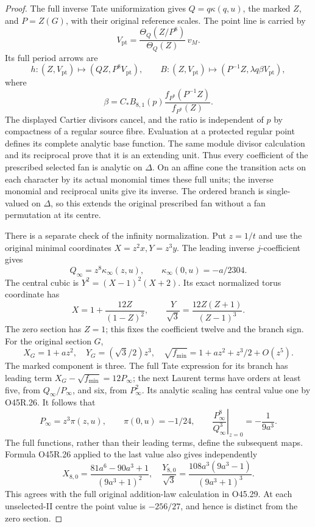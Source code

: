 \begin{proof}
The full inverse Tate uniformization gives
\(Q=q\kappa(q,u)\), the marked \(Z\), and
\(P=Z(G)\), with their original reference
scales. The point line is carried by
\[
 V_{\mathrm{pt}}=
 \frac{\Theta_Q(Z/P^8)}{\Theta_Q(Z)}\,v_M.
 \tag{O45R.22}
\]
Its full period arrows are
\[
 h:(Z,V_{\mathrm{pt}})\mapsto(QZ,P^8V_{\mathrm{pt}}),
 \qquad
 B:(Z,V_{\mathrm{pt}})\mapsto
        (P^{-1}Z,\lambda q\beta V_{\mathrm{pt}}),
 \tag{O45R.23}
\]
where
\[
 \beta=C_* B_{8,1}(p)
       \frac{f_{P^8}(P^{-1}Z)}{f_{P^8}(Z)} .
 \tag{O45R.24}
\]
The displayed Cartier divisors cancel, and
the ratio is independent of \(p\) by
compactness of a regular source fibre.
Evaluation at a protected regular point
defines its complete analytic base function.
The same module divisor calculation and
its reciprocal prove that it is an
extending unit. Thus every coefficient of
the prescribed selected fan is analytic on
\(\Delta\). On an affine cone the transition
acts on each character by its actual
monomial times these full units; the
inverse monomial and reciprocal units
give its inverse. The ordered branch is
single-valued on \(\Delta\), so this
extends the original prescribed fan
without a fan permutation at its centre.

There is a separate check of the infinity
normalization. Put \(z=1/t\) and use the
original minimal coordinates
\(X=z^2x,Y=z^3y\). The leading inverse
\(j\)-coefficient gives
\[
 Q_\infty=z^8\kappa_\infty(z,u),\qquad
 \kappa_\infty(0,u)=-a/2304 .
 \tag{O45R.25}
\]
The central cubic is
\(Y^2=(X-1)^2(X+2)\). Its exact normalized
torus coordinate has
\[
 X=1+\frac{12Z}{(1-Z)^2},\qquad
 \frac{Y}{\sqrt3}
      =\frac{12Z(Z+1)}{(Z-1)^3}.
 \tag{O45R.26}
\]
The zero section has \(Z=1\); this fixes
the coefficient twelve and the branch
sign. For the original section \(G\),
\[
 X_G=1+az^2,\quad
 Y_G=(\sqrt3/2)z^3,\quad
 \sqrt{f_{\min}}=1+az^2+z^3/2+O(z^5).
 \tag{O45R.27}
\]
The marked component is three. The full
Tate expression for its branch has leading
term \(X_G-\sqrt{f_{\min}}=12P_\infty\);
the next Laurent terms have orders at least
five, from \(Q_\infty/P_\infty\), and six,
from \(P_\infty^2\). Its analytic scaling
has central value one by O45R.26.
It follows that
\[
 P_\infty=z^3\pi(z,u),\qquad
 \pi(0,u)=-1/24,\qquad
 \left.\frac{P_\infty^8}{Q_\infty^3}\right|_{z=0}
          =-\frac1{9a^3}.
 \tag{O45R.28}
\]
The full functions, rather than their
leading terms, define the subsequent
maps. Formula O45R.26 applied to the
last value also gives independently
\[
 X_{8,0}=\frac{81a^6-90a^3+1}{(9a^3+1)^2},
 \quad
 \frac{Y_{8,0}}{\sqrt3}
       =\frac{108a^3(9a^3-1)}{(9a^3+1)^3}.
 \tag{O45R.29}
\]
This agrees with the full original
addition-law calculation in O45.29.
At each unselected-II centre the point
value is \(-256/27\), and hence is
distinct from the zero section.


\end{proof}
